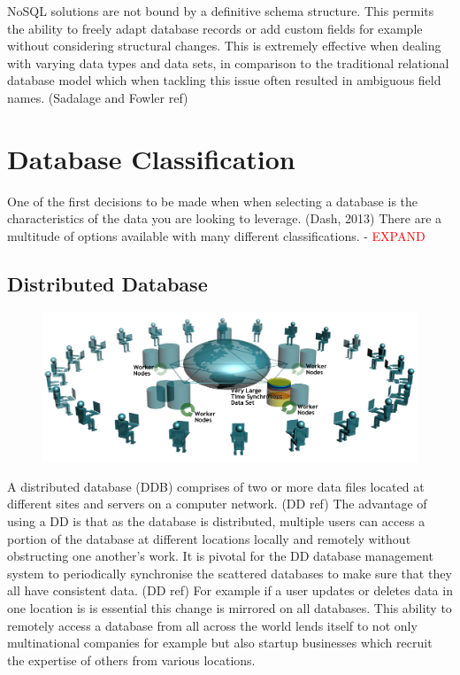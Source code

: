 NoSQL solutions are not bound by a definitive schema structure. This permits the ability to freely adapt database records or add custom fields for example without considering structural changes. This is extremely effective when dealing with varying data types and data sets, in comparison to the traditional relational database model which when tackling this issue often resulted in ambiguous field names. (Sadalage and Fowler ref)

\section{Database Classification}
One of the first decisions to be made when when selecting a database is the characteristics of the data you are looking to leverage. (Dash, 2013) There are a multitude of options available with many different classifications. - \textcolor{red}{EXPAND}

\subsection{Distributed Database}\label{distributeddb}
\begin{figure}\includegraphics[width=0.9\linewidth]{images/ddelogo}\end{figure} A distributed database (DDB) comprises of two or more data files located at different sites and servers on a computer network. (DD ref) The advantage of using a DD is that as the database is distributed, multiple users can access a portion of the database at different locations locally and remotely without obstructing one another's work. It is  pivotal for the DD database management system to periodically synchronise the scattered databases to make sure that they all have consistent data. (DD ref) For example if a user updates or deletes data in one location is is essential this change is mirrored on all databases. This ability to remotely access a database from all across the world lends itself to not only multinational companies for example but also startup businesses which recruit the expertise of others from various locations.

